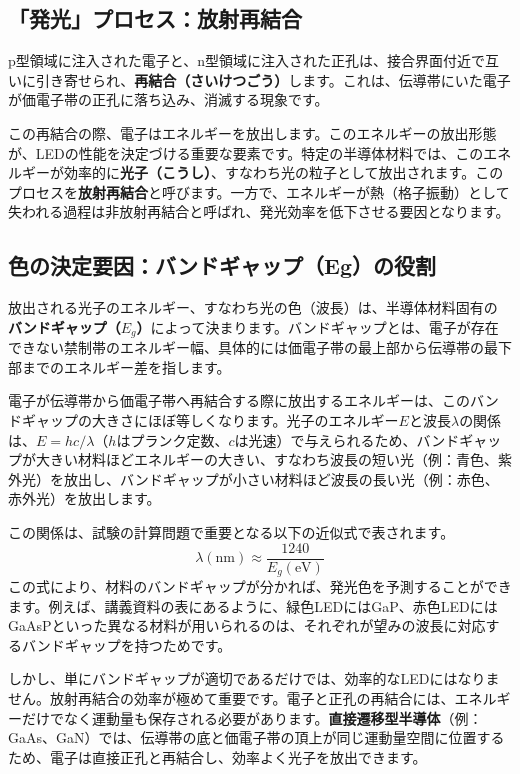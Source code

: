 \documentclass[11pt,a4paper]{ltjsarticle}
\begin{document}
\subsection{「発光」プロセス：放射再結合}

p型領域に注入された電子と、n型領域に注入された正孔は、接合界面付近で互いに引き寄せられ、\textbf{再結合（さいけつごう）}します。これは、伝導帯にいた電子が価電子帯の正孔に落ち込み、消滅する現象です\cite{ref1}。

この再結合の際、電子はエネルギーを放出します。このエネルギーの放出形態が、LEDの性能を決定づける重要な要素です。特定の半導体材料では、このエネルギーが効率的に\textbf{光子（こうし）}、すなわち光の粒子として放出されます。このプロセスを\textbf{放射再結合}と呼びます\cite{ref1}。一方で、エネルギーが熱（格子振動）として失われる過程は非放射再結合と呼ばれ、発光効率を低下させる要因となります。

\subsection{色の決定要因：バンドギャップ（Eg）の役割}

放出される光子のエネルギー、すなわち光の色（波長）は、半導体材料固有の\textbf{バンドギャップ（$E_g$）}によって決まります。バンドギャップとは、電子が存在できない禁制帯のエネルギー幅、具体的には価電子帯の最上部から伝導帯の最下部までのエネルギー差を指します\cite{ref1}。

電子が伝導帯から価電子帯へ再結合する際に放出するエネルギーは、このバンドギャップの大きさにほぼ等しくなります。光子のエネルギー$E$と波長$\lambda$の関係は、$E=hc/\lambda$（$h$はプランク定数、$c$は光速）で与えられるため、バンドギャップが大きい材料ほどエネルギーの大きい、すなわち波長の短い光（例：青色、紫外光）を放出し、バンドギャップが小さい材料ほど波長の長い光（例：赤色、赤外光）を放出します\cite{ref4}。

この関係は、試験の計算問題で重要となる以下の近似式で表されます。
\[ \lambda (\si{\nano\meter}) \approx \frac{1240}{E_g (\si{\electronvolt})} \]
この式により、材料のバンドギャップが分かれば、発光色を予測することができます\cite{ref6}。例えば、講義資料の表にあるように、緑色LEDにはGaP、赤色LEDにはGaAsPといった異なる材料が用いられるのは、それぞれが望みの波長に対応するバンドギャップを持つためです\cite{ref1}。

しかし、単にバンドギャップが適切であるだけでは、効率的なLEDにはなりません。放射再結合の効率が極めて重要です。電子と正孔の再結合には、エネルギーだけでなく運動量も保存される必要があります。\textbf{直接遷移型半導体}（例：GaAs、GaN）では、伝導帯の底と価電子帯の頂上が同じ運動量空間に位置するため、電子は直接正孔と再結合し、効率よく光子を放出できます。
\end{document}
